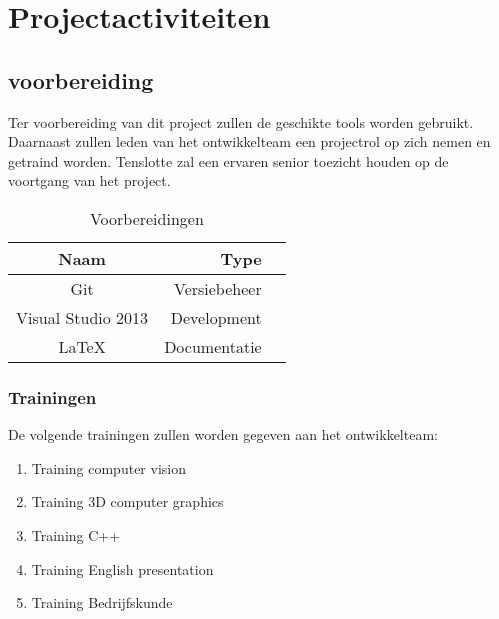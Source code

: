 \chapter{Projectactiviteiten} \label{cha:projectactiviteiten}



\section{voorbereiding} \label{sec:voorbereiding}
Ter voorbereiding van dit project zullen de geschikte tools worden gebruikt. Daarnaast zullen leden van het ontwikkelteam een projectrol op zich nemen en getraind worden. Tenslotte zal een ervaren senior toezicht houden op de voortgang van het project.
\\
\begin{table}[h]
  \centering
  \caption{Voorbereidingen}
  \label{tb:table}
  \begin{tabular}{crl}
    \toprule
    Naam     & Type\\
    \midrule
    Git     & Versiebeheer\\
    Visual Studio 2013  & Development\\
    LaTeX & Documentatie\\    
    \bottomrule
  \end{tabular}
\end{table}
\subsection{Trainingen} \label{subsec:trainingen}
De volgende trainingen zullen worden gegeven aan het ontwikkelteam:
\begin{enumerate}
  \item Training computer vision
  \item Training 3D computer graphics
  \item Training C++
  \item Training English presentation
  \item Training Bedrijfskunde
\end{enumerate}

